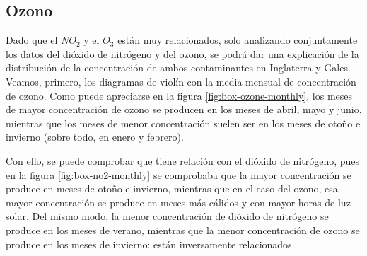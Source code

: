 \documentclass[12pt]{article}
\begin{document}
\subsection{Ozono}

Dado que el $NO_{2}$ y el $O_{3}$ están muy relacionados, solo analizando conjuntamente los datos del dióxido de nitrógeno y del ozono, se podrá dar una explicación de la distribución de la concentración de ambos contaminantes en Inglaterra y Gales. Veamos, primero, los diagramas de violín con la media mensual de concentración de ozono. Como puede apreciarse en la figura \ref{fig:box-ozone-monthly}, los meses de mayor concentración de ozono se producen en los meses de abril, mayo y junio, mientras que los meses de menor concentración suelen ser en los meses de otoño e invierno (sobre todo, en enero y febrero).

Con ello, se puede comprobar que tiene relación con el dióxido de nitrógeno, pues en la figura \ref{fig:box-no2-monthly} se comprobaba que la mayor concentración se produce en meses de otoño e invierno, mientras que en el caso del ozono, esa mayor concentración se produce en meses más cálidos y con mayor horas de luz solar. Del mismo modo, la menor concentración de dióxido de nitrógeno se produce en los meses de verano, mientras que la menor concentración de ozono se produce en los meses de invierno: están inversamente relacionados.
\end{document}
